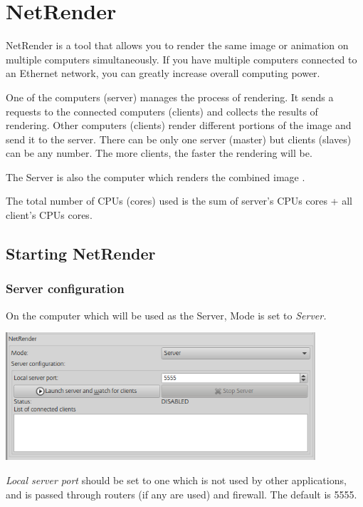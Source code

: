 \section{NetRender}\label{netrender}

NetRender is a tool that allows you to render the same image or animation on
multiple computers simultaneously. If you have multiple computers connected to
an Ethernet network, you can greatly increase overall computing power.

One of the computers (server) manages the process of rendering. It sends a
requests to the connected computers (clients) and collects the results of
rendering. Other computers (clients) render different portions of the image and
send it to the server. There can be only one server (master) but clients
(slaves) can be any number. The more clients, the faster the rendering will be.

The Server is also the computer which renders the combined image .

The total number of CPUs (cores) used is the sum of server's CPUs cores + all
client's CPUs cores.

\subsection{Starting NetRender}\label{starting-netrender}

\subsubsection{Server configuration}\label{server-configuration}

On the computer which will be used as the Server, Mode is set to \emph{Server.}

\includegraphics[width=4.53071in,height=1.86614in]{img/manual/media/image27.png}

\emph{Local server port} should be set to one which is not used by other
applications, and is passed through routers (if any are used) and firewall. The
default is 5555.

